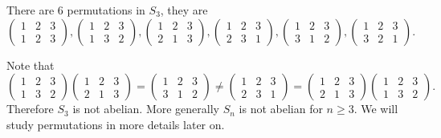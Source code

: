 \documentclass[main.tex]{subfiles}
\begin{document}
				\begin{example}
					There are 6 permutations in $S_3$, they are
					\begin{equation*}
					\begin{pmatrix}
					1 & 2 & 3\\
					1 & 2 & 3
					\end{pmatrix}, 
					\begin{pmatrix}
					1 & 2 & 3\\
					1 & 3 & 2
					\end{pmatrix}, 
					\begin{pmatrix}
					1 & 2 & 3\\
					2 & 1 & 3
					\end{pmatrix}, 
					\begin{pmatrix}
					1 & 2 & 3\\
					2 & 3 & 1
					\end{pmatrix}, 
					\begin{pmatrix}
					1 & 2 & 3\\
					3 & 1 & 2
					\end{pmatrix},
					\begin{pmatrix}
					1 & 2 & 3\\
					3 & 2 & 1
					\end{pmatrix}.
					\end{equation*}
				\end{example}
			Note that
			\begin{equation*}
				\begin{pmatrix}
					1 & 2 & 3 \\
					1 & 3 & 2
				\end{pmatrix}
				\begin{pmatrix}
				1 & 2 & 3 \\
				2 & 1 & 3
				\end{pmatrix}
				= \begin{pmatrix}
				1 & 2 & 3 \\
				3 & 1 & 2
				\end{pmatrix}
				\neq
				\begin{pmatrix}
				1 & 2 & 3 \\
				2 & 3 & 1
				\end{pmatrix}
				= 	\begin{pmatrix}
				1 & 2 & 3 \\
				2 & 1 & 3
				\end{pmatrix}
				\begin{pmatrix}
				1 & 2 & 3 \\
				1 & 3 & 2
				\end{pmatrix}.
			\end{equation*}
			Therefore $S_3$ is not abelian. More generally $S_n$ is not abelian for $n \geq 3$. We will study permutations in more details later on.
\end{document}
